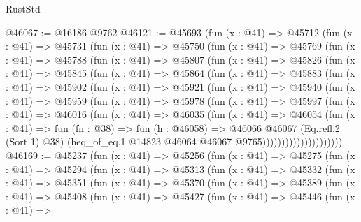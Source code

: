 \begin{lexlean}{RustStd}
\begin{coremodule}
@46067 := @16186 @9762
@46121 := @45693
    (fun (x : @41) =>
    @45712
      (fun (x : @41) =>
      @45731
        (fun (x : @41) =>
        @45750
          (fun (x : @41) =>
          @45769
            (fun (x : @41) =>
            @45788
              (fun (x : @41) =>
              @45807
                (fun (x : @41) =>
                @45826
                  (fun (x : @41) =>
                  @45845
                    (fun (x : @41) =>
                    @45864
                      (fun (x : @41) =>
                      @45883
                        (fun (x : @41) =>
                        @45902
                          (fun (x : @41) =>
                          @45921
                            (fun (x : @41) =>
                            @45940
                              (fun (x : @41) =>
                              @45959
                                (fun (x : @41) =>
                                @45978
                                  (fun (x : @41) =>
                                  @45997
                                    (fun (x : @41) =>
                                    @46016
                                      (fun (x : @41) =>
                                      @46035
                                        (fun (x : @41) =>
                                        @46054
                                          (fun (x : @41) =>
                                          fun (fn : @38) =>
                                          fun (h : @46058) =>
                                          @46066
                                            @46067
                                            (Eq.refl.{2} (Sort 1) @38)
                                            (heq_of_eq.{1}
                                              @14823
                                              @46064
                                              @46067
                                              @9765)))))))))))))))))))))
@46169 := @45237
    (fun (x : @41) =>
    @45256
      (fun (x : @41) =>
      @45275
        (fun (x : @41) =>
        @45294
          (fun (x : @41) =>
          @45313
            (fun (x : @41) =>
            @45332
              (fun (x : @41) =>
              @45351
                (fun (x : @41) =>
                @45370
                  (fun (x : @41) =>
                  @45389
                    (fun (x : @41) =>
                    @45408
                      (fun (x : @41) =>
                      @45427
                        (fun (x : @41) =>
                        @45446
                          (fun (x : @41) =>

\end{coremodule}
\end{lexlean}
